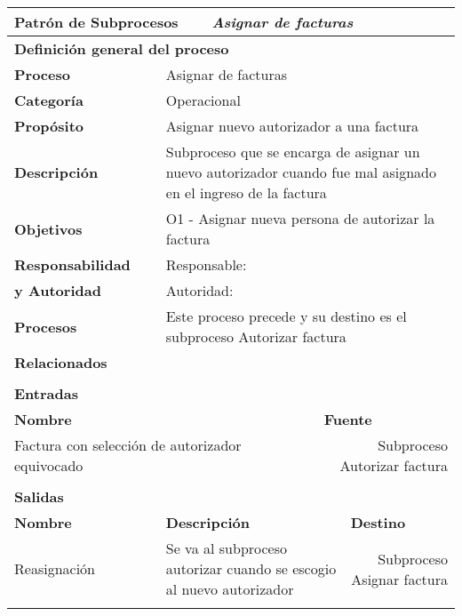 \begin{longtable}{|llrrrrrr|}
	\hline
	\multicolumn{2}{|l|}{\textbf{Patrón de Subprocesos}} & \multicolumn{6}{|l|}{\textit{Asignar de facturas}} \\ \hline
	\multicolumn{8}{|l|}{\textbf{Definición general del proceso}} \\ \hline
	\textbf{Proceso} & \multicolumn{7}{|m{12cm}|}{Asignar de facturas} \\ \hline
	\textbf{Categoría} & \multicolumn{7}{|m{12cm}|}{Operacional} \\ \hline
	\textbf{Propósito} & \multicolumn{7}{|m{12cm}|}{Asignar nuevo autorizador a una factura} \\ \hline
    \textbf{Descripción} & \multicolumn{7}{|m{12cm}|}{Subproceso que se encarga de asignar un nuevo autorizador cuando fue mal asignado en el ingreso de la factura} \\ \hline
	\multirow{0}[6]{*}{\textbf{Objetivos}} 
          & \multicolumn{7}{|l|}{O1 -  Asignar nueva persona de autorizar la factura} \\ \hline
    \multicolumn{1}{|l|}{\textbf{Responsabilidad}} 	& \multicolumn{7}{|l|}{Responsable: } \\
	\multicolumn{1}{|l|}{\textbf{y Autoridad}} 	& \multicolumn{7}{|l|}{Autoridad: } \\ \hline
    \multicolumn{1}{|l|}{\textbf{Procesos}} 	& \multicolumn{7}{|m{12cm}|}{Este proceso precede y su destino es el subproceso Autorizar factura} \\
	\multicolumn{1}{|l|}{\textbf{Relacionados}} 	&  \multicolumn{7}{|m{12cm}|}{} \\ \hline
          &       &       &       &       &       &       &  \\ \hline
    \multicolumn{8}{|l|}{\textbf{Entradas}} \\ \hline
    \multicolumn{5}{|l|}{\textbf{Nombre}}   & \multicolumn{3}{|l|}{\textbf{Fuente}} \\ \hline
    \multicolumn{5}{|l|}{Factura con selección de autorizador equivocado} & \multicolumn{3}{|m{3.5cm}|}{Subproceso Autorizar factura} \\  \hline
       &       &       &       &       &       &       &  \\ \hline
    \multicolumn{8}{|l|}{\textbf{Salidas}} \\ \hline
    \textbf{Nombre} & \multicolumn{5}{|l|}{\textbf{Descripción}} & \multicolumn{2}{|l|}{\textbf{Destino}} \\ \hline
    Reasignación & \multicolumn{5}{|m{6cm}|}{Se va al subproceso autorizar cuando se escogio al nuevo autorizador} & \multicolumn{2}{|m{3cm}|}{Subproceso Asignar factura} \\ \hline
       &       &       &       &       &       &       &  \\ \hline
	

\end{longtable}
